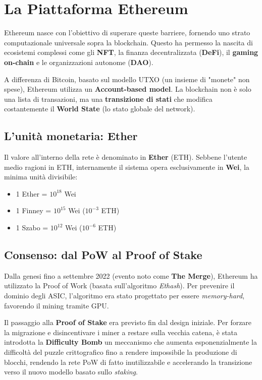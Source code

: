 \section{La Piattaforma Ethereum}
Ethereum nasce con l'obiettivo di superare queste barriere, fornendo uno strato computazionale universale sopra la blockchain. Questo ha permesso la nascita di ecosistemi complessi come gli \textbf{NFT}, la finanza decentralizzata (\textbf{DeFi}), il \textbf{gaming on-chain} e le organizzazioni autonome (\textbf{DAO}).

A differenza di Bitcoin, basato sul modello UTXO (un insieme di "monete" non spese), Ethereum utilizza un \textbf{Account-based model}. La blockchain non è solo una lista di transazioni, ma una \textbf{transizione di stati} che modifica costantemente il \textbf{World State} (lo stato globale del network).

\subsection{L'unità monetaria: Ether}
Il valore all'interno della rete è denominato in \textbf{Ether} (ETH). Sebbene l'utente medio ragioni in ETH, internamente il sistema opera esclusivamente in \textbf{Wei}, la minima unità divisibile:
\begin{itemize}
    \item 1 Ether = $10^{18}$ Wei
    \item 1 Finney = $10^{15}$ Wei ($10^{-3}$ ETH)
    \item 1 Szabo = $10^{12}$ Wei ($10^{-6}$ ETH)
\end{itemize}

\subsection{Consenso: dal PoW al Proof of Stake}
Dalla genesi fino a settembre 2022 (evento noto come \textbf{The Merge}), Ethereum ha utilizzato la Proof of Work (basata sull'algoritmo \textit{Ethash}). Per prevenire il dominio degli ASIC, l'algoritmo era stato progettato per essere \textit{memory-hard}, favorendo il mining tramite GPU.

Il passaggio alla \textbf{Proof of Stake} era previsto fin dal design iniziale. Per forzare la migrazione e disincentivare i miner a restare sulla vecchia catena, è stata introdotta la \textbf{Difficulty Bomb} un meccanismo che aumenta esponenzialmente la difficoltà del puzzle crittografico fino a rendere impossibile la produzione di blocchi, rendendo la rete PoW di fatto inutilizzabile e accelerando la transizione verso il nuovo modello basato sullo \textit{staking}.

